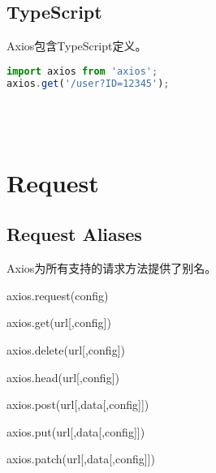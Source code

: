 \section{TypeScript}

Axios包含TypeScript定义。

\begin{lstlisting}[language=JavaScript]
import axios from 'axios';
axios.get('/user?ID=12345');
\end{lstlisting}


\begin{lstlisting}[language=JavaScript]

\end{lstlisting}




\begin{lstlisting}[language=JavaScript]

\end{lstlisting}




\begin{lstlisting}[language=JavaScript]

\end{lstlisting}





\begin{lstlisting}[language=JavaScript]

\end{lstlisting}

\chapter{Request}


\section{Request Aliases}

Axios为所有支持的请求方法提供了别名。

\begin{compactitem}
\item axios.request(config)
\item axios.get(url[,config])
\item axios.delete(url[,config])
\item axios.head(url[,config])
\item axios.post(url[,data[,config]])
\item axios.put(url[,data[,config]])
\item axios.patch(url[,data[,config]])
\end{compactitem}

